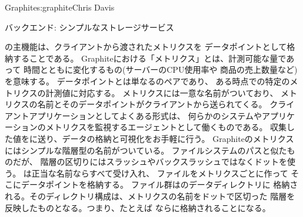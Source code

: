 \begin{aosachapter}{Graphite}{s:graphite}{Chris Davis}
\begin{aosasect1}{バックエンド: シンプルなストレージサービス}

の主機能は、クライアントから渡されたメトリクスを
データポイントとして格納することである。
Graphiteにおける「メトリクス」とは、計測可能な量であって
時間とともに変化するもの(サーバーのCPU使用率や
商品の売上数量など)を意味する。
データポイントとは単なるのペアであり、
ある時点での特定のメトリクスの計測値に対応する。
メトリクスには一意な名前がついており、
メトリクスの名前とそのデータポイントがクライアントから送られてくる。
クライアントアプリケーションとしてよくある形式は、
何らかのシステムやアプリケーションのメトリクスを監視するエージェントとして働くものである。
収集した値をに送り、データの格納と可視化をお手軽に行う。
Graphiteのメトリクスにはシンプルな階層型の名前がついている。
ファイルシステムのパスと似たものだが、
階層の区切りにはスラッシュやバックスラッシュではなくドットを使う。
は正当な名前ならすべて受け入れ、
ファイルをメトリクスごとに作って
そこにデータポイントを格納する。
ファイル群はのデータディレクトリに
格納される。そのディレクトリ構成は、メトリクスの名前をドットで区切った
階層を反映したものとなる。つまり、たとえば
ならに格納されることになる。


\end{aosasect1}
\end{aosachapter}
